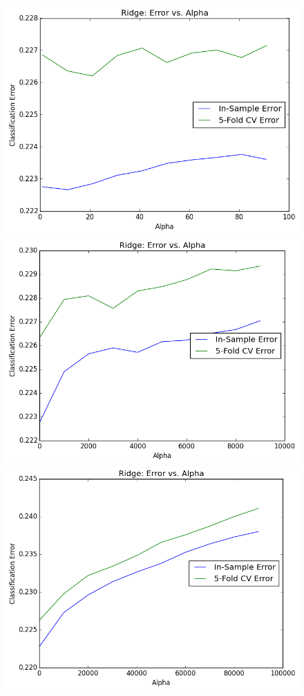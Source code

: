 \begin{itemize}
\begin{itemize}
\begin{figure}[H]
\centering
\includegraphics[scale=0.25]{ridge-vs-alpha}
\includegraphics[scale=0.25]{ridge-vs-alpha3}
\includegraphics[scale=0.25]{ridge-vs-alpha2}

\end{figure}
\end{itemize}
\end{itemize}
